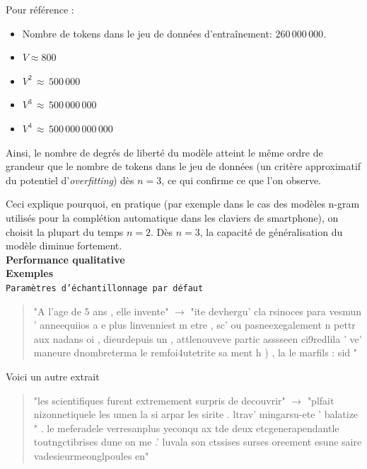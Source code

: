 Pour référence :

\begin{itemize}
\item
  Nombre de tokens dans le jeu de données d'entraînement:
  $260\,000\,000$.
\item
  $V \approx 800$
\item
  $V^2\,\approx\,500\,000$
\item
  $V^3\,\approx\,500\,000\,000$
\item
  $V^4\,\approx\,500\,000\,000\,000$
\end{itemize}

Ainsi, le nombre de degrés de liberté du modèle atteint le même ordre
de grandeur que le nombre de tokens dans le jeu de données (un critère
approximatif du potentiel d'\textit{overfitting}) dès $n=3$, ce qui
confirme ce que l'on observe.

Ceci explique pourquoi, en pratique (par exemple dans le cas des modèles
n-gram utilisés pour la complétion automatique dans les claviers de
smartphone), on choisit la plupart du temps \(n=2\). Dès \(n=3\), la
capacité de généralisation du modèle diminue fortement. \\

\noindent{}\textbf{Performance qualitative} \\

\textbf{Exemples} \\


\noindent{} \texttt{Paramètres d'échantillonnage par défaut}

  \begin{quotation}
  "A l'age de 5 ans , elle invente" $\rightarrow$ "ite devhergu' cla rsinoces para vesmun ' anneequiios a e plus linvenniest m etre  , sc' ou pasneexegalement n pettr aux nadans oi , dieurdepuis un  , attlenouveve partic asssseen ci9redlila ' ve' maneure dnombreterma le remfoi4utetrite sa ment h ) , la le marfils : sid "
  \end{quotation}


Voici un autre extrait

  \begin{quotation}
  "les scientifiques furent extremement surpris de decouvrir" $\rightarrow$ "plfait nizonnetiquele les  umen la si arpar les sirite  . ltrav' mingarsu-ete ' balatize  " . le meferadele verresanplus yeconqu ax tde deux  etcgenerapendantle toutngctibrises dune on me  .' luvala son ctssises surses oreement esune saire vadesieurmeonglpoules en"
  \end{quotation}


